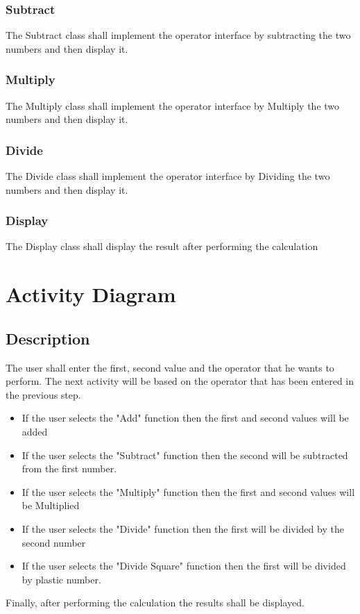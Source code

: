 \documentclass{report}
\begin{document}
\subsection{Subtract}
The Subtract class shall implement the operator interface by subtracting the two numbers and then display it.
\subsection{Multiply}
The Multiply class shall implement the operator interface by Multiply the two numbers and then display it.
\subsection{Divide}
The Divide class shall implement the operator interface by Dividing the two numbers and then display it.
\subsection{Display}
The Display class shall display the result after performing the calculation
\chapter{Activity Diagram}
\section{Description}
The user shall enter the first, second value and the operator that he wants to perform.\newline
\newline The next activity will be based on the operator that has been entered in the previous step.
\begin{itemize}
    \item If the user selects the "Add" function then the first and second values will be added
    \item If the user selects the "Subtract" function then the second will be subtracted from the first number.
    \item If the user selects the "Multiply" function then the first and second values will be Multiplied
    \item If the user selects the "Divide" function then the first will be divided by the second number
    \item If the user selects the "Divide Square" function then the first will be divided by plastic number.
\end{itemize}
Finally, after performing the calculation the results shall be displayed.
\end{document}
